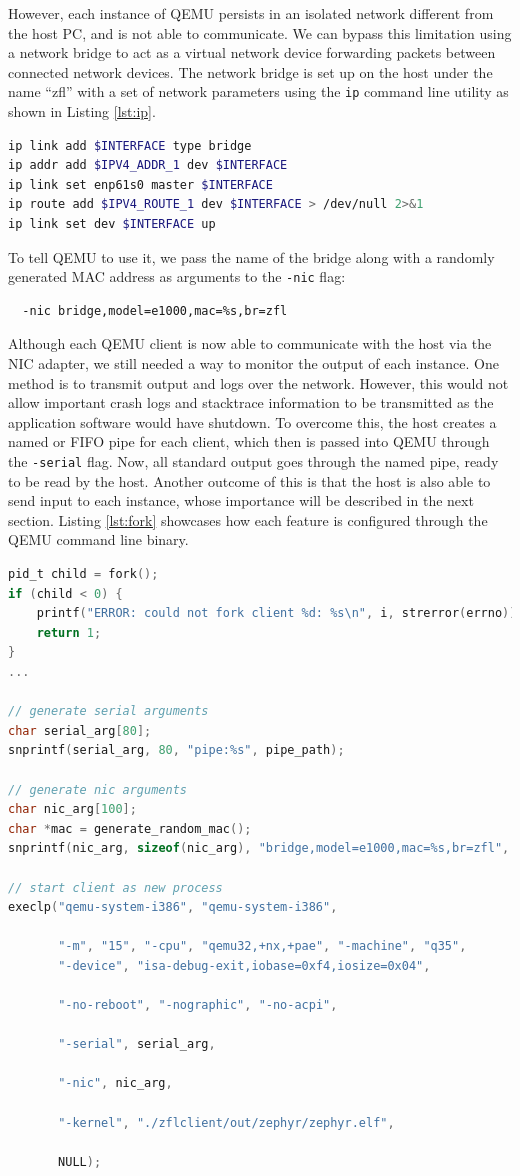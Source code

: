 \documentclass[12pt]{article}
\begin{document}
However, each instance of QEMU persists in an isolated network different from the host PC,
and is not able to communicate. We can bypass this limitation using a network bridge to act as a
virtual network device forwarding packets between connected network devices.
The network bridge is set up on the host under the name ``zfl'' with a set of network parameters using
the \verb|ip| command line utility as shown in Listing \ref{lst:ip}.
\begin{lstlisting}[language=bash,caption=Network bridge setup,label={lst:ip}]
ip link add $INTERFACE type bridge
ip addr add $IPV4_ADDR_1 dev $INTERFACE
ip link set enp61s0 master $INTERFACE
ip route add $IPV4_ROUTE_1 dev $INTERFACE > /dev/null 2>&1
ip link set dev $INTERFACE up
\end{lstlisting}
To tell QEMU to use it, we pass the name of the bridge along
with a randomly generated MAC address as arguments to the \verb|-nic| flag:
\begin{verbatim}
  -nic bridge,model=e1000,mac=%s,br=zfl
\end{verbatim}

Although each QEMU client is now able to communicate with the host via the NIC adapter, we still
needed a way to monitor the output of each instance. One method is to transmit
output and logs over the network. However, this would not allow important crash logs and stacktrace
information to be transmitted as the application software would have shutdown. To overcome this, the host
creates a named or FIFO pipe for each client, which then is passed into
QEMU through the \verb|-serial| flag. Now, all standard output goes through the named pipe, ready to be read
by the host. Another outcome of this is that the host is also able to send input to each
instance, whose importance will be described in the next section. Listing \ref{lst:fork} showcases
how each feature is configured through the QEMU command line binary.

\begin{lstlisting}[language=C,caption=Client forking process,label={lst:fork}]
pid_t child = fork();
if (child < 0) {
    printf("ERROR: could not fork client %d: %s\n", i, strerror(errno));
    return 1;
}
...

// generate serial arguments
char serial_arg[80];
snprintf(serial_arg, 80, "pipe:%s", pipe_path);

// generate nic arguments
char nic_arg[100];
char *mac = generate_random_mac();
snprintf(nic_arg, sizeof(nic_arg), "bridge,model=e1000,mac=%s,br=zfl", mac);

// start client as new process
execlp("qemu-system-i386", "qemu-system-i386",

       "-m", "15", "-cpu", "qemu32,+nx,+pae", "-machine", "q35",
       "-device", "isa-debug-exit,iobase=0xf4,iosize=0x04",

       "-no-reboot", "-nographic", "-no-acpi",

       "-serial", serial_arg,

       "-nic", nic_arg,

       "-kernel", "./zflclient/out/zephyr/zephyr.elf",

       NULL);
\end{lstlisting}
\end{document}
